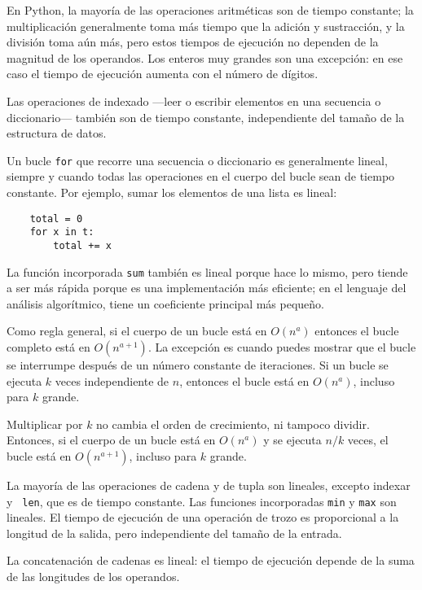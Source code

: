 \documentclass[10pt]{book}
\begin{document}
En Python, la mayoría de las operaciones aritméticas son de tiempo constante;
la multiplicación generalmente toma más tiempo que la adición y sustracción, y
la división toma aún más, pero estos tiempos de ejecución no dependen de la
magnitud de los operandos.  Los enteros muy grandes son una excepción: en
ese caso el tiempo de ejecución aumenta con el número de dígitos.

Las operaciones de indexado ---leer o escribir elementos en una secuencia
o diccionario--- también son de tiempo constante, independiente del tamaño
de la estructura de datos.

Un bucle {\tt for} que recorre una secuencia o diccionario es
generalmente lineal, siempre y cuando todas las operaciones en el cuerpo
del bucle sean de tiempo constante.  Por ejemplo, sumar los
elementos de una lista es lineal:

\begin{verbatim}
    total = 0
    for x in t:
        total += x
\end{verbatim}

La función incorporada {\tt sum} también es lineal porque hace
lo mismo, pero tiende a ser más rápida porque es una implementación
más eficiente; en el lenguaje del análisis algorítmico,
tiene un coeficiente principal más pequeño.

Como regla general, si el cuerpo de un bucle está en $O(n^a)$ entonces
el bucle completo está en $O(n^{a+1})$.  La excepción es cuando puedes
mostrar que el bucle se interrumpe después de un número constante de iteraciones.
Si un bucle se ejecuta $k$ veces independiente de $n$, entonces
el bucle está en $O(n^a)$, incluso para $k$ grande.

Multiplicar por $k$ no cambia el orden de crecimiento, ni tampoco
dividir.  Entonces, si el cuerpo de un bucle está en $O(n^a)$ y se ejecuta
$n/k$ veces, el bucle está en $O(n^{a+1})$, incluso para $k$ grande.

La mayoría de las operaciones de cadena y de tupla son lineales, excepto indexar y {\tt
  len}, que es de tiempo constante.  Las funciones incorporadas {\tt min} y
{\tt max} son lineales.  El tiempo de ejecución de una operación de trozo es
proporcional a la longitud de la salida, pero independiente del tamaño
de la entrada.

La concatenación de cadenas es lineal: el tiempo de ejecución depende de la suma
de las longitudes de los operandos.
\end{document}
